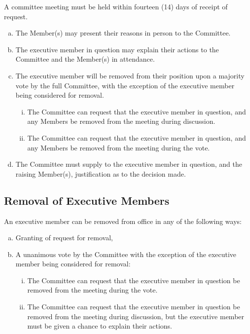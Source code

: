 \documentclass[a4paper,12pt]{article}
\begin{document}
A committee meeting must be held within fourteen (14) days of receipt of request.

\begin{enumerate}[a)]
	\item The Member(s) may present their reasons in person to the Committee.
	\item The executive member in question may explain their actions to the Committee and the Member(s) in attendance.
	\item The executive member will be removed from their position upon a majority vote by the full Committee, with the exception of the executive member being considered for removal.
	\begin{enumerate}[i)]
		\item The Committee can request that the executive member in question, and any Members be removed from the meeting during discussion.
		\item The Committee can request that the executive member in question, and any Members be removed from the meeting during the vote.
	\end{enumerate}
	\item The Committee must supply to the executive member in question, and the raising Member(s), justification as to the decision made.
\end{enumerate}

\subsection{Removal of Executive Members}

An executive member can be removed from office in any of the following ways:

\begin{enumerate}[a)]
	\item Granting of request for removal,
	\item A unanimous vote by the Committee with the exception of the executive member being considered for removal:
	\begin{enumerate}[i)]
		\item The Committee can request that the executive member in question be removed from the meeting during the vote.
		\item The Committee can request that the executive member in question be removed from the meeting during discussion, but the executive member must be given a chance to explain their actions.
	\end{enumerate}
\end{enumerate}
\end{document}
